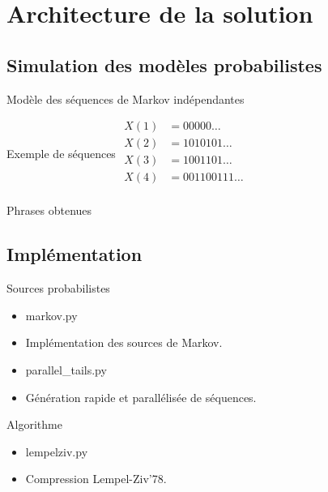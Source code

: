 \section{Architecture de la solution}
\subsection{Simulation des modèles probabilistes}


{
\begin{frame}{Modèle des séquences de Markov indépendantes}

	\begin{block}{Exemple de séquences}
		$\begin{array}{cl}
		X(1) &= 00000\dots \\
		X(2) &= 1010101\dots \\
		X(3) &= 1001101\dots \\
		X(4) &= 001100111\dots \\
	    \end{array}$
	\end{block}

	\begin{block}{Phrases obtenues}
	\end{block}

\end{frame}}

\subsection{Implémentation}

\begin{frame}
	\begin{block}{Sources probabilistes}
		\begin{itemize}
			\item[] {\color{gray} markov.py } 
			\item[] \quad Implémentation des sources de Markov. 
			\item[] {\color{gray} parallel\_tails.py} 
			\item[] \quad Génération rapide et parallélisée de séquences.
		\end{itemize}
	\end{block}

	\begin{block}{Algorithme}
		\begin{itemize}
			\item[] {\color{gray} lempelziv.py} 
			\item[] \quad Compression Lempel-Ziv'78.
		\end{itemize}
	\end{block}
\end{frame}

